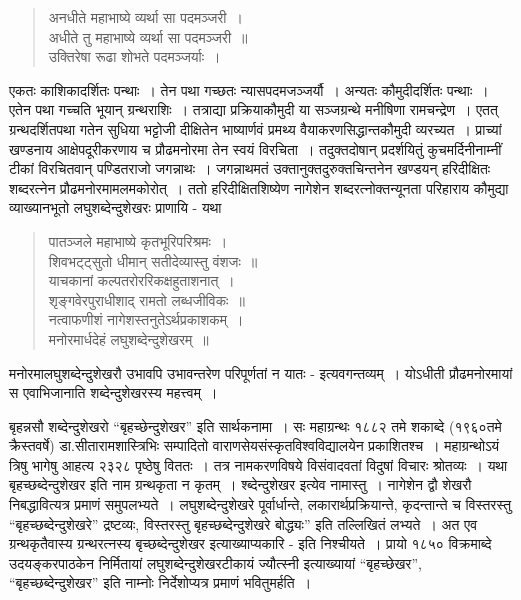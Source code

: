 {\begin{verse}
अनधीते महाभाष्ये व्यर्था सा पदमञ्जरी~। \\
अधीते तु महाभाष्ये व्यर्था सा पदमञ्जरी~॥\\
उक्तिरेषा रूढा शोभते पदमञ्जर्याः~। 
\end{verse}

एकतः काशिकादर्शितः पन्थाः~। तेन पथा गच्छतः न्यासपदमजञ्जर्यौ~। अन्यतः कौमुदीदर्शितः पन्थाः~। एतेन पथा गच्चति भूयान् ग्रन्थराशिः~। तत्राद्या प्रक्रियाकौमुदी या सञ्जग्रन्थे मनीषिणा रामचन्द्रेण~। एतत् ग्रन्थदर्शितपथा गतेन सुधिया भट्टोजी दीक्षितेन भाष्यार्णवं प्रमथ्य वैयाकरणसिद्धान्तकौमुदी व्यरच्यत~। प्राच्यां खण्डनाय आक्षेपदूरीकरणाय च प्रौढमनोरमा तेन स्वयं विरचिता~। तदुक्तदोषान् प्रदर्शयितुं कुचमर्दिनीनाम्नीं टीकां विरचितवान् पण्डितराजो जगन्नाथः~। जगन्नाथमतं उक्तानुक्तदुरुक्तचिन्तनेन खण्डयन् हरिदीक्षितः शब्दरत्नेन प्रौढमनोरमामलमकोरोत्~। ततो हरिदीक्षितशिष्येण नागेशेन शब्दरत्नोक्तन्यूनता परिहाराय कौमुद्या व्याख्यानभूतो लघुशब्देन्दुशेखरः प्राणायि - यथा 

\begin{verse}
पातञ्जले महाभाष्ये कृतभूरिपरिश्रमः~। \\
शिवभट्ट्सुतो धीमान् सतीदेव्यास्तु वंशजः~॥\\
याचकानां कल्पतरोररिकक्षहुताशनात्~। \\
शृङ्गवेरपुराधीशाद् रामतो लब्धजीविकः~॥\\
नत्वाफणीशं नागेशस्तनुतेऽर्थप्रकाशकम्~। \\
मनोरमार्धदेहं लघुशब्देन्दुशेखरम्~॥
\end{verse}

मनोरमालघुशब्देन्दुशेखरौ उभावपि उभावन्तरेण परिपूर्णतां न यातः - इत्यवगन्तव्यम्~। योऽधीती प्रौढमनोरमायां स एवाभिजानाति शब्देन्दुशेखरस्य महत्त्वम्~। 

बृहन्नसौ शब्देन्दुशेखरो “बृहच्छेन्दुशेखर” इति सार्थकनामा~। सः महाग्रन्थः १८८२ तमे शकाब्दे (१९६०तमे क्रैस्तवर्षे) डा.सीतारामशास्त्रिभिः सम्पादितो वाराणसेयसंस्कृतविश्वविद्यालयेन प्रकाशितश्च~। महाग्रन्थोऽयं त्रिषु भागेषु आहत्य २३२८ पृष्ठेषु विततः~। तत्र नामकरणविषये विसंवादवतां विदुषां विचारः श्रोतव्यः~। यथा बृहच्छब्देन्दुशेखर इति नाम ग्रन्थकृता न कृतम्~। श्ब्देन्दुशेखर इत्येव नामास्तु~। नागेशेन द्वौ शेखरौ निबद्धावित्यत्र प्रमाणं समुपलभ्यते~। लघुशब्देन्दुशेखरे पूर्वार्धान्ते, लकारार्थप्रक्रियान्ते, कृदन्तान्ते च विस्तरस्तु “बृहच्छब्देन्दुशेखरे” द्रष्टव्यः, विस्तरस्तु बृहच्छब्देन्दुशेखरे बोद्ध्यः” इति तल्लिखितं लभ्यते~। अत एव ग्रन्थकृतैवास्य ग्रन्थरत्नस्य बृच्छब्देन्दुशेखर इत्याख्याप्यकारि - इति निश्चीयते~। प्रायो १८५० विक्रमाब्दे उदयङ्करपाठकेन निर्मितायां लघुशब्देन्दुशेखरटीकायं ज्यौत्स्नी इत्याख्यायां “बृहच्छेखर”, “बृहच्छब्देन्दुशेखर” इति नाम्नोः निर्देशोप्यत्र प्रमाणं भवितुमर्हति~। 

}

